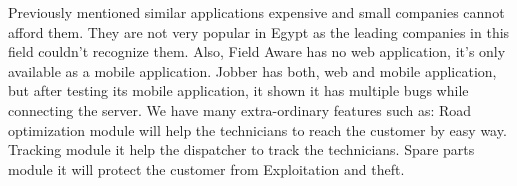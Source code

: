 Previously mentioned similar applications expensive and small companies cannot afford them. They are not very popular in Egypt as the leading companies in this field couldn’t recognize them. Also, Field Aware has no web application, it's only available as a mobile application. Jobber has both, web and mobile application, but after testing its mobile application, it shown it has multiple bugs while connecting the server. 
We have many extra-ordinary features such as: 
Road optimization module will help the technicians to reach the customer by easy way.
Tracking module it help the dispatcher to track the technicians.
Spare parts module it will protect the customer from Exploitation and theft.